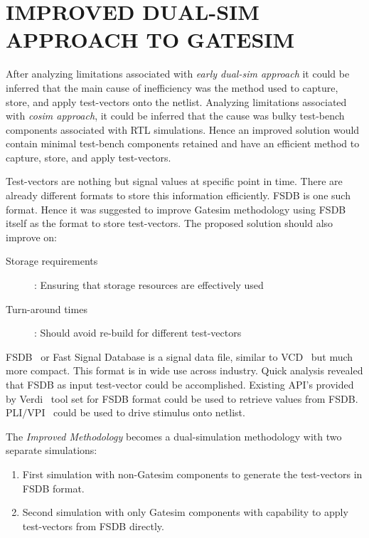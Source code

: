 \chapter{IMPROVED DUAL-SIM APPROACH TO GATESIM}
\label{chap:dualsim.tex}
After analyzing limitations associated with \emph{early dual-sim approach} it could be inferred that the main cause of inefficiency was the method used to capture, store, and apply test-vectors onto the netlist. Analyzing limitations associated with \emph{cosim approach}, it could be inferred that the cause was bulky test-bench components associated with RTL simulations. Hence an improved solution would contain minimal test-bench components retained and have an efficient method to capture, store, and apply test-vectors. 

Test-vectors are nothing but signal values at specific point in time. There are already different formats to store this information efficiently. FSDB  is one such format. Hence it was suggested to improve Gatesim methodology using FSDB itself as the format to store test-vectors. The proposed solution should also improve on:

\begin{description}
	\item[Storage requirements]: Ensuring that storage resources are effectively used
	\item[Turn-around times]: Should avoid re-build for different test-vectors
\end{description}

FSDB~\citep{SS:Verdi} or Fast Signal Database is a signal data file, similar to VCD~\citep{ieee:v:2005}  but much more compact. This format is in wide use across industry. Quick analysis revealed that FSDB as input test-vector could be accomplished. Existing API's  provided by Verdi~\citep{SS:Verdi} tool set for FSDB format could be used to retrieve values from FSDB. PLI$/$VPI~\citep{ieee:v:2005} could be used to drive stimulus onto netlist.


The {\it Improved Methodology} becomes a dual-simulation methodology with two separate simulations:
\begin{enumerate}
	\item First simulation with non-Gatesim components to generate the test-vectors in FSDB format.
	\item Second simulation with only Gatesim components with capability to apply test-vectors from FSDB directly.
\end{enumerate}



